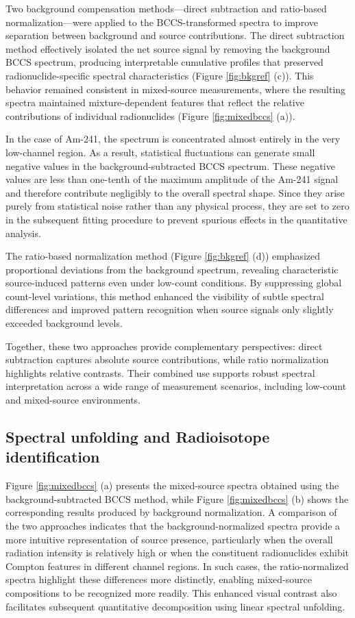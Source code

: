 \documentclass[10pt]{wlscirep}
\begin{document}
Two background compensation methods—direct subtraction and ratio-based normalization—were applied to the BCCS-transformed spectra to improve separation between background and source contributions. The direct subtraction method effectively isolated the net source signal by removing the background BCCS spectrum, producing interpretable cumulative profiles that preserved radionuclide-specific spectral characteristics (Figure \ref{fig:bkgref} (c)). This behavior remained consistent in mixed-source measurements, where the resulting spectra maintained mixture-dependent features that reflect the relative contributions of individual radionuclides (Figure \ref{fig:mixedbccs} (a)). 

In the case of Am-241, the spectrum is concentrated almost entirely in the very low-channel region. As a result, statistical fluctuations can generate small negative values in the background-subtracted BCCS spectrum. These negative values are less than one-tenth of the maximum amplitude of the Am-241 signal and therefore contribute negligibly to the overall spectral shape. Since they arise purely from statistical noise rather than any physical process, they are set to zero in the subsequent fitting procedure to prevent spurious effects in the quantitative analysis. 

The ratio-based normalization method (Figure \ref{fig:bkgref} (d)) emphasized proportional deviations from the background spectrum, revealing characteristic source-induced patterns even under low-count conditions. By suppressing global count-level variations, this method enhanced the visibility of subtle spectral differences and improved pattern recognition when source signals only slightly exceeded background levels.

Together, these two approaches provide complementary perspectives: direct subtraction captures absolute source contributions, while ratio normalization highlights relative contrasts. Their combined use supports robust spectral interpretation across a wide range of measurement scenarios, including low-count and mixed-source environments.

\subsection*{ Spectral unfolding and Radioisotope identification}

Figure \ref{fig:mixedbccs} (a) presents the mixed-source spectra obtained using the background-subtracted BCCS method, while Figure \ref{fig:mixedbccs} (b) shows the corresponding results produced by background normalization. A comparison of the two approaches indicates that the background-normalized spectra provide a more intuitive representation of source presence, particularly when the overall radiation intensity is relatively high or when the constituent radionuclides exhibit Compton features in different channel regions. In such cases, the ratio-normalized spectra highlight these differences more distinctly, enabling mixed-source compositions to be recognized more readily. This enhanced visual contrast also facilitates subsequent quantitative decomposition using linear spectral unfolding.
\end{document}
